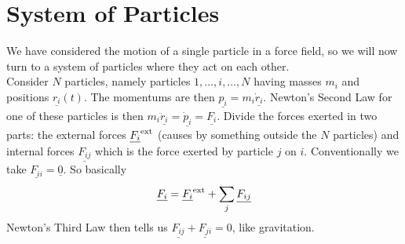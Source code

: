 \section{System of Particles}
We have considered the motion of a single particle in a force field, so we will now turn to a system of particles where they act on each other.\\
Consider $N$ particles, namely particles $1,\ldots,i,\ldots,N$ having masses $m_i$ and positions $\underline{r_i}(t)$.
The momentums are then $\underline{p_i}=m_i\underline{\dot{r}_i}$.
Newton's Second Law for one of these particles is then $m_i\underline{\ddot{r}_i}=\underline{\dot{p}_i}=\underline{F_i}$.
Divide the forces exerted in two parts: the external forces $\underline{F_i}^{\rm ext}$ (causes by something outside the $N$ particles) and internal forces $\underline{F_{ij}}$ which is the force exerted by particle $j$ on $i$.
Conventionally we take $\underline{F_{ii}}=\underline{0}$.
So basically
$$\underline{F_i}=\underline{F_i}^{\rm ext}+\sum_j\underline{F_{ij}}$$
Newton's Third Law then tells us $\underline{F_{ij}}+\underline{F_{ji}}=0$, like gravitation.
